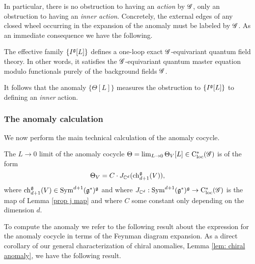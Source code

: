 \documentclass[10pt]{amsart}
\begin{document}
In particular, there is no obstruction to having an {\em action} by $\mathscr G$, only an obstruction to having an {\em inner action}. 
Concretely, the external edges of any closed wheel occurring in the expansion of the anomaly must be labeled by $\mathscr G$. 
As an immediate consequence we have the following.

\begin{lem}
The effective family $\{I^{\mathfrak g}[L]\}$ defines a one-loop exact $\mathscr G$-equivariant quantum field theory.
In other words, it satisfies the $\mathscr G$-equivariant quantum master equation modulo functionals purely of the background fields $\mathscr G$. 
\end{lem}

It follows that the anomaly $\{\Theta[L]\}$ measures the obstruction to $\{I^\mathfrak g[L]\}$ to defining an {\em inner} action. 

%

\subsubsection{The anomaly calculation}

We now perform the main technical calculation of the anomaly cocycle.

\begin{prop}\label{prop: inner anomaly}
The $L\to 0$ limit of the anomaly cocycle $\Theta = \lim_{L \to 0} \Theta_V[L]  \in {\rm C}_{\rm loc}^*(\mathscr G)$ is of the form
\[
\Theta_V = C \cdot J_{\mathbb C^d}({\rm ch}_{d+1}^\mathfrak g (V)),
\]
where ${\rm ch}_{d+1}^\mathfrak g(V) \in {\rm Sym}^{d+1}(\mathfrak g^*)^\mathfrak g$ and where $J_{\mathbb C^d} : {\rm Sym}^{d+1}(\mathfrak g^*)^\mathfrak g \to {\rm C}_{\rm loc}^*(\mathscr G)$ is the map of Lemma \ref{prop j map} and where $C$ some constant only depending on the dimension $d$. 
\end{prop}

To compute the anomaly we refer to the following result about the expression for the anomaly cocycle in terms of the Feynman diagram expansion.
As a direct corollary of our general characterization of chiral anomalies, Lemma \ref{lem: chiral anomaly}, we have the following result.
\end{document}
